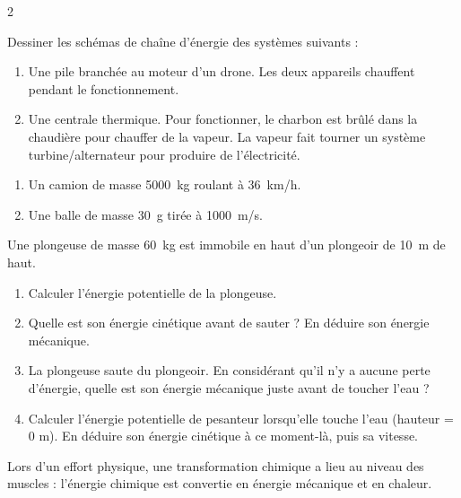 \documentclass[11pt,a5paper,landscape]{article}
\begin{document}
\begin{multicols*}{2}


Dessiner les schémas de chaîne d'énergie des systèmes suivants :
\begin{enumerate}[label=\alph*)]
    \item Une pile branchée au moteur d'un drone. Les deux appareils chauffent pendant le fonctionnement.
    \item Une centrale thermique. Pour fonctionner, le charbon est brûlé dans la chaudière pour chauffer de la vapeur. La vapeur fait tourner un système turbine/alternateur pour produire de l'électricité.
\end{enumerate}


\begin{enumerate}[label=\alph*)]
    \item Un camion de masse \SI{5000}{kg} roulant à \SI{36}{km/h}.
    \item Une balle de masse \SI{30}{g} tirée à \SI{1000}{m/s}.
\end{enumerate}


Une plongeuse de masse \SI{60}{kg} est immobile en haut d'un plongeoir de \SI{10}{m} de haut.

\begin{enumerate}[label=\alph*)]
    \item Calculer l'énergie potentielle de la plongeuse.
    \item Quelle est son énergie cinétique avant de sauter ? En déduire son énergie mécanique.
    \item La plongeuse saute du plongeoir. En considérant qu'il n'y a aucune perte d'énergie, quelle est son énergie mécanique juste avant de toucher l'eau ?
    \item Calculer l'énergie potentielle de pesanteur lorsqu'elle touche l'eau (hauteur = 0 m). En déduire son énergie cinétique à ce moment-là, puis sa vitesse.
\end{enumerate}


Lors d'un effort physique, une transformation chimique a lieu au niveau des muscles : l'énergie chimique est convertie en énergie mécanique et en chaleur.


\end{multicols*}
\end{document}
